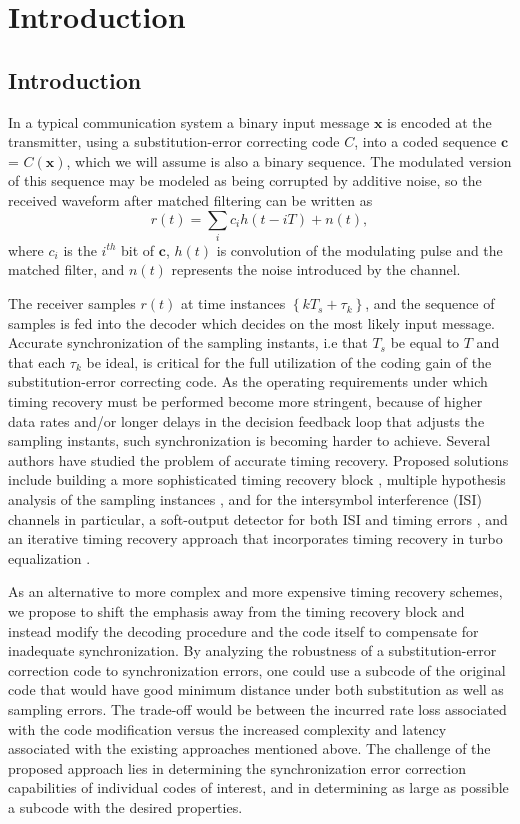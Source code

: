 \chapter[Introduction]{Introduction}
\section{Introduction} \label{Intro}

In a typical communication system a binary input message
$\mathbf{x}$ is encoded at the transmitter, using a
substitution-error correcting code $C$, into a coded sequence
$\mathbf{c}$ = $C(\mathbf{x})$, which we will assume is also a
binary sequence. The modulated version of this sequence may be
modeled as being corrupted by additive noise, so the received
waveform after matched filtering  can be written as
\begin{equation}
r(t)=\sum_{i} c_i h(t-iT) +n(t),
\end{equation}
where $c_i$ is the $i^{th}$%
bit of $\mathbf{c}$, $h(t)$ is convolution of the modulating pulse
and the matched filter, and $n(t)$ represents the noise introduced
by the channel.

The receiver samples $r(t)$ at time instances
$\left\{kT_s+\tau_k\right\} $, and the sequence of samples is fed
into the decoder which decides on the most likely input message.
Accurate synchronization of the sampling instants, i.e that $T_s$
be equal to $T$ and that each $\tau_k$ be ideal, is critical for
the full utilization of the coding gain of the substitution-error
correcting code. As the operating requirements under which timing
recovery must be performed become more stringent, because of
higher data rates and/or longer delays in the decision feedback
loop that adjusts the sampling instants, such synchronization is
becoming harder to achieve. Several authors have studied the
problem of accurate timing recovery. Proposed solutions include
building a more sophisticated timing recovery block \cite{liu:02},
multiple hypothesis analysis of the sampling instances
\cite{kbek:04}, and for the intersymbol interference (ISI)
channels in particular, a soft-output detector for both ISI and
timing errors \cite{zhangkavcic:03}, and an iterative timing
recovery approach that incorporates timing recovery in turbo
equalization \cite{iterativetr:04}.

As an alternative to more complex and more expensive timing
recovery schemes, we propose to shift the emphasis away from the
timing recovery block  and instead modify the decoding procedure
and the code itself to compensate for inadequate synchronization.
By analyzing the robustness of a substitution-error correction
code to synchronization errors, one could use a subcode of the
original code that would have good minimum distance under both
substitution as well as sampling errors. The trade-off would be
between the incurred rate loss associated with the code
modification versus the increased complexity and latency
associated with the existing approaches mentioned above. The
challenge of the proposed approach lies in determining the
synchronization error correction capabilities of individual codes
of interest, and in determining as large as possible a subcode
with the desired properties.


